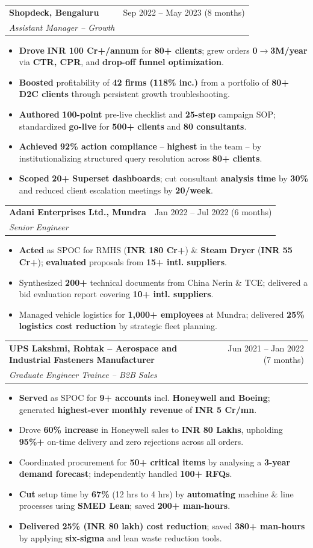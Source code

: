 \documentclass[a4paper,10pt]{article}
\makeatletter
\newcommand{\role}[4]{%
  \vspace{1pt}%
  \begin{tabular*}{\textwidth}{l@{\extracolsep{\fill}}r}
    \textbf{\small #1} & \small #2 \\
    \textit{\small #3} & \textit{\small #4} \\
  \end{tabular*}\vspace{0pt}%
}
\newcommand{\blist}{\begin{itemize}[leftmargin=0.15in, label={--}, itemsep=-1pt, topsep=3pt, parsep=0pt]}
\newcommand{\elistb}{\end{itemize}\vspace{0pt}}
\makeatother
\begin{document}
\role{Shopdeck, Bengaluru}{Sep 2022 -- May 2023 (8 months)}{Assistant Manager -- Growth}{}
\blist
  \item \small \textbf{Drove} \textbf{INR 100 Cr+/annum} for \textbf{80+ clients}; grew orders \textbf{0$\to$3M/year} via \textbf{CTR, CPR}, and \textbf{drop-off funnel optimization}.
  \item \small \textbf{Boosted} profitability of \textbf{42 firms (118\% inc.)} from a portfolio of \textbf{80+ D2C clients} through persistent growth troubleshooting.
  \item \small \textbf{Authored} \textbf{100-point} pre-live checklist and \textbf{25-step} campaign SOP; standardized \textbf{go-live} for \textbf{500+ clients} and \textbf{80 consultants}.
  \item \small \textbf{Achieved} \textbf{92\% action compliance} -- \textbf{highest} in the team -- by institutionalizing structured query resolution across \textbf{80+ clients}.
  \item \small \textbf{Scoped} \textbf{20+ Superset dashboards}; cut consultant \textbf{analysis time} by \textbf{30\%} and reduced client escalation meetings by \textbf{20/week}.
\elistb

\role{Adani Enterprises Ltd., Mundra}{Jan 2022 -- Jul 2022 (6 months)}{Senior Engineer}{}
\blist
  \item \small \textbf{Acted} as SPOC for RMHS (\textbf{INR 180 Cr+}) \& \textbf{Steam Dryer} (\textbf{INR 55 Cr+}); \textbf{evaluated} proposals from \textbf{15+ intl. suppliers}.
  \item \small Synthesized \textbf{200+} technical documents from China Nerin \& TCE; delivered a bid evaluation report covering \textbf{10+ intl. suppliers}.
  \item \small Managed vehicle logistics for \textbf{1,000+ employees} at Mundra; delivered \textbf{25\% logistics cost reduction} by strategic fleet planning.
\elistb

\role{UPS Lakshmi, Rohtak -- Aerospace and Industrial Fasteners Manufacturer}{Jun 2021 -- Jan 2022 (7 months)}{Graduate Engineer Trainee -- B2B Sales}{}
\blist
  \item \small \textbf{Served} as SPOC for \textbf{9+ accounts} incl. \textbf{Honeywell and Boeing}; generated \textbf{highest-ever} \textbf{monthly revenue} of \textbf{INR 5 Cr/mn}.
  \item \small Drove \textbf{60\% increase} in Honeywell sales to \textbf{INR 80 Lakhs}, upholding \textbf{95\%+} on-time delivery and zero rejections across all orders.
  \item \small Coordinated procurement for \textbf{50+ critical items} by analysing a \textbf{3-year demand forecast}; independently handled \textbf{100+ RFQs}.
  \item \small \textbf{Cut} setup time by \textbf{67\%} (12 hrs to 4 hrs) by \textbf{automating} machine \& line processes using \textbf{SMED Lean}; saved \textbf{200+ man-hours}.
  \item \small \textbf{Delivered} \textbf{25\% (INR 80 lakh) cost reduction}; saved \textbf{380+ man-hours} by applying \textbf{six-sigma} and lean waste reduction tools.
\elistb
\end{document}
